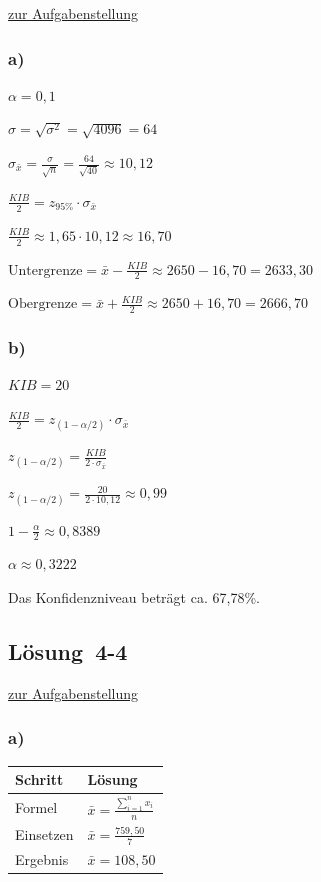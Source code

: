 \documentclass[
  11pt,
  ngerman,
  a4paper,
]{report}
\begin{document}
\protect\hyperlink{aufgabe-4-3}{zur Aufgabenstellung}

\hypertarget{a-15}{%
\subsubsection{a)}\label{a-15}}

\(\alpha=0{,}1\)

\(\sigma=\sqrt{\sigma^2}=\sqrt{4096}=64\)

\(\sigma_{\bar{x}}=\frac{\sigma}{\sqrt{n}}=\frac{64}{\sqrt{40}}\approx10{,}12\)

\(\frac{\mathit{KIB}}{2}=z_{95\%} \cdot \sigma_{\bar{x}}\)

\(\frac{\mathit{KIB}}{2}\approx 1{,}65 \cdot 10{,}12\approx16{,}70\)

\(\textrm{Untergrenze} = \bar{x} - \frac{\mathit{KIB}}{2} \approx 2650 - 16{,}70 = 2633{,}30\)

\(\textrm{Obergrenze} = \bar{x} + \frac{\mathit{KIB}}{2} \approx 2650 + 16{,}70 = 2666{,}70\)

\hypertarget{b-15}{%
\subsubsection{b)}\label{b-15}}

\(\mathit{KIB}=20\)

\(\frac{\mathit{KIB}}{2}=z_{(1-\alpha/2)} \cdot \sigma_{\bar{x}}\)

\(z_{(1-\alpha/2)}=\frac{\mathit{KIB}}{2\cdot \sigma_{\bar{x}}}\)

\(z_{(1-\alpha/2)}=\frac{20}{2 \cdot 10{,}12}\approx0{,}99\)

\(1-\frac{\alpha}{2}\approx0{,}8389\)

\(\alpha\approx 0{,}3222\)

Das Konfidenzniveau beträgt ca. 67,78\%.

\hypertarget{loesung-4-4}{%
\subsection{Lösung~4-4}\label{loesung-4-4}}

\protect\hyperlink{aufgabe-4-4}{zur Aufgabenstellung}

\hypertarget{a-16}{%
\subsubsection{a)}\label{a-16}}

\begin{table}[H]
\centering
\begin{tabular}{ll}
\toprule
\textbf{Schritt} & \textbf{Lösung}\\
\midrule
Formel & $\bar{x}=\frac{\sum\limits_{i=1}^{n}x_{i}}{n}$\\
Einsetzen & $\bar{x}=\frac{759{,}50}{7}$\\
Ergebnis & $\bar{x}=108{,}50$\\
\bottomrule
\end{tabular}
\end{table}
\end{document}
